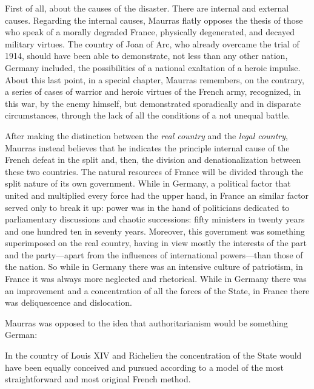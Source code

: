 First of all, about the causes of the disaster. There are internal and external causes. Regarding the internal causes, Maurras flatly opposes the thesis of those who speak of a morally degraded France, physically degenerated, and decayed military virtues. The country of Joan of Arc, who already overcame the trial of 1914, should have been able to demonstrate, not less than any other nation, Germany included, the possibilities of a national exaltation of a heroic impulse. About this last point, in a special chapter, Maurras remembers, on the contrary, a series of cases of warrior and heroic virtues of the French army, recognized, in this war, by the enemy himself, but demonstrated sporadically and in disparate circumstances, through the lack of all the conditions of a not unequal battle.

After making the distinction between the \emph{real country} and the \emph{legal country}, Maurras instead believes that he indicates the principle internal cause of the French defeat in the split and, then, the division and denationalization between these two countries. The natural resources of France will be divided through the split nature of its own government. While in Germany, a political factor that united and multiplied every force had the upper hand, in France an similar factor served only to break it up: power was in the hand of politicians dedicated to parliamentary discussions and chaotic successions: fifty ministers in twenty years and one hundred ten in seventy years. Moreover, this government was something superimposed on the real country, having in view mostly the interests of the part and the party---apart from the influences of international powers---than those of the nation. So while in Germany there was an intensive culture of patriotism, in France it was always more neglected and rhetorical. While in Germany there was an improvement and a concentration of all the forces of the State, in France there was deliquescence and dislocation.

Maurras was opposed to the idea that authoritarianism would be something German:

\begin{quotex}
In the country of Louis XIV and Richelieu the concentration of the State would have been equally conceived and pursued according to a model of the most straightforward and most original French method.
\end{quotex}

